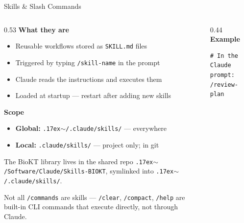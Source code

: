 \documentclass[aspectratio=169, 10pt]{beamer}
\begin{document}
\begin{frame}[fragile]{Skills \& Slash Commands}
  \begin{columns}[T]
    \begin{column}{0.53\textwidth}
      \textbf{\color{biokteal}What they are}
      \begin{itemize}[label=\textbullet]\setlength\itemsep{3pt}
        \item Reusable workflows stored as \texttt{SKILL.md} files
        \item Triggered by typing \texttt{/skill-name} in the prompt
        \item Claude reads the instructions and executes them
        \item Loaded at startup --- restart after adding new skills
      \end{itemize}
      \vspace{0.4em}
      \textbf{\color{biokteal}Scope}
      \begin{itemize}[label=\textbullet]\setlength\itemsep{3pt}\small
        \item \textbf{Global:} \texttt{{\raise.17ex\hbox{$\scriptstyle\sim$}}/.claude/skills/} --- everywhere
        \item \textbf{Local:} \texttt{.claude/skills/} --- project only; in git
      \end{itemize}
      \vspace{0.2em}
      {\scriptsize\color{biokteal!70} The BioKT library lives in the shared repo \texttt{{\raise.17ex\hbox{$\scriptstyle\sim$}}/Software/Claude/Skills-BIOKT}, symlinked into \texttt{{\raise.17ex\hbox{$\scriptstyle\sim$}}/.claude/skills/}.\par}
      \vspace{0.4em}
      {\small\color{biokteal!70} Not all \texttt{/commands} are skills --- \texttt{/clear}, \texttt{/compact}, \texttt{/help} are built-in CLI commands that execute directly, not through Claude.}
    \end{column}
    \begin{column}{0.44\textwidth}
      \textbf{\color{biokteal}Example}
      \begin{lstlisting}
# In the Claude prompt:
/review-plan


\end{lstlisting}
\end{column}
\end{columns}
\end{frame}
\end{document}
